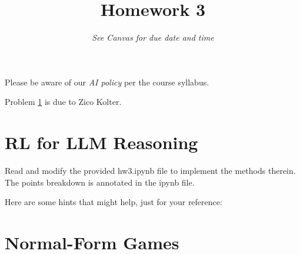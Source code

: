 \title{Homework 3}
\date{{\em See Canvas for due date and time}}

    

Please be aware of our {\em AI policy} per the course syllabus.

Problem \ref{sec:rl_llm_reasoning} is due to Zico Kolter.

\section{RL for LLM Reasoning}
\label{sec:rl_llm_reasoning}
Read and modify the provided hw3.ipynb file to implement the methods therein.
The points breakdown is annotated in the ipynb file.

Here are some hints that might help, just for your reference:

\section{Normal-Form Games}
\label{sec:normal-form-games}

